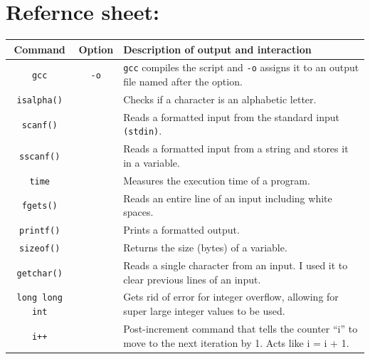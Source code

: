 \documentclass{article}
\begin{document}
\section{Refernce sheet:}
\begin{tabular}{|c|c|p{4.2in}|}
\hline
Command & Option & Description of output and interaction \\
\hline
\hline
\texttt{gcc} & \texttt{-o} & \texttt{gcc} compiles the script and \texttt{-o} assigns it to an output file named after the option.\\
\hline
\texttt{isalpha()} & & Checks if a character is an alphabetic letter.\\
\hline
\texttt{scanf()} & & Reads a formatted input from the standard input \texttt{(stdin)}.\\
\hline
\texttt{sscanf()} & & Reads a formatted input from a string and stores it in a variable.\\
\hline
\texttt{time} & & Measures the execution time of a program.\\
\hline
\texttt{fgets()} & & Reads an entire line of an input including white spaces.\\
\hline
\texttt{printf()} & & Prints a formatted output.\\
\hline
\texttt{sizeof()} & & Returns the size (bytes) of a variable.\\
\hline
\texttt{getchar()} & & Reads a single character from an input. I used it to clear previous lines of an input.\\
\hline
\texttt{long long int} & & Gets rid of error for integer overflow, allowing for super large integer values to be used.\\
\hline
\texttt{i++} & & Post-increment command that tells the counter ``i'' to move to the next iteration by 1. Acts like i = i + 1.\\
\hline
\end{tabular}
\newpage
\end{document}
